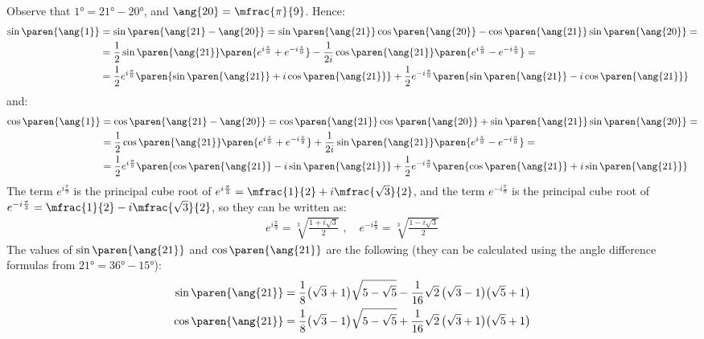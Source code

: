Observe that
$\ang{1} = \ang{21} - \ang{20}$,
and $\ang{20} = \mfrac{\pi}{9}$.
Hence:
\begin{align*}
 \sin\paren{\ang{1}}
 &= \sin\paren{\ang{21} - \ang{20}}
  = \sin\paren{\ang{21}} \cos\paren{\ang{20}}
    - \cos\paren{\ang{21}} \sin\paren{\ang{20}} = \\
 &= \frac{1}{2} \sin\paren{\ang{21}}
    \paren{e^{i \frac{\pi}{9}} + e^{ -i \frac{\pi}{9}}}
    - \frac{1}{2 i} \cos\paren{\ang{21}}
    \paren{e^{i \frac{\pi}{9}} - e^{ -i \frac{\pi}{9}}} = \\
 &= \frac{1}{2} e^{i \frac{\pi}{9}}
    \paren{ \sin\paren{\ang{21}} + i \cos\paren{\ang{21}}}
    + \frac{1}{2} e^{ -i \frac{\pi}{9}}
    \paren{ \sin\paren{\ang{21}} - i \cos\paren{\ang{21}}}
\end{align*}
and:
\begin{align*}
 \cos\paren{\ang{1}}
 &= \cos\paren{\ang{21} - \ang{20}}
  = \cos\paren{\ang{21}} \cos\paren{\ang{20}}
    + \sin\paren{\ang{21}} \sin\paren{\ang{20}} = \\
 &= \frac{1}{2} \cos\paren{\ang{21}}
    \paren{e^{i \frac{\pi}{9}} + e^{ -i \frac{\pi}{9}}}
    + \frac{1}{2 i} \sin\paren{\ang{21}}
    \paren{e^{i \frac{\pi}{9}} - e^{ -i \frac{\pi}{9}}} = \\
 &= \frac{1}{2} e^{i \frac{\pi}{9}}
    \paren{ \cos\paren{\ang{21}} - i \sin\paren{\ang{21}}}
    + \frac{1}{2} e^{ -i \frac{\pi}{9}}
    \paren{ \cos\paren{\ang{21}} + i \sin\paren{\ang{21}}}
\end{align*}
The term $e^{i \frac{\pi}{9}}$
is the principal cube root of
$e^{i \frac{\pi}{3}} = \mfrac{1}{2} + i \mfrac{\sqrt{3}}{2}$,
and the term $e^{- i \frac{\pi}{9}}$
is the principal cube root of
$e^{- i \frac{\pi}{3}} = \mfrac{1}{2} - i \mfrac{\sqrt{3}}{2}$,
so they can be written as:
\begin{align*}
 e^{i \frac{\pi}{9}}
 = \sqrt[3]{\frac{1 + i \sqrt{3}}{2}} \,\, , \,\,\,\,\,\,
 e^{- i \frac{\pi}{9}}
 = \sqrt[3]{\frac{1 - i \sqrt{3}}{2}}
\end{align*}
The values of $\sin\paren{\ang{21}}$ and $\cos\paren{\ang{21}}$ are the following (they can be calculated using the angle difference formulas from $\ang{21} = \ang{36} - \ang{15}$):
\begin{align*}
 \sin\paren{\ang{21}}
 &= \frac{1}{8} \big( \sqrt{3} + 1 \big) \sqrt{5 - \sqrt{5}}
     - \frac{1}{16} \sqrt{2} \, \big( \sqrt{3} - 1 \big) \big(\sqrt{5} + 1 \big)
 \\
 \cos\paren{\ang{21}}
 &= \frac{1}{8} \big( \sqrt{3} - 1 \big) \sqrt{5 - \sqrt{5}}
     + \frac{1}{16} \sqrt{2} \, \big( \sqrt{3} + 1 \big) \big( \sqrt{5} + 1 \big)
\end{align*}
